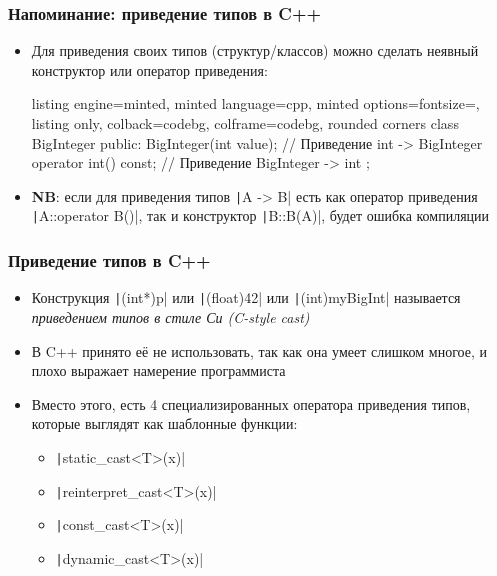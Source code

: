 \documentclass[10pt]{beamer}
\begin{document}
\begin{frame}[fragile]
\frametitle{Напоминание: приведение типов в C++}
\begin{itemize}
\item Для приведения своих типов (структур/классов) можно сделать неявный конструктор или оператор приведения:
\begin{tcblisting}{listing engine=minted, minted language=cpp, minted options={fontsize=\scriptsize}, listing only, colback=codebg, colframe=codebg, rounded corners}
class BigInteger {
public:
  BigInteger(int value); // Приведение int -> BigInteger
  operator int() const; // Приведение BigInteger -> int
};
\end{tcblisting}
\pause
{}
\item \textbf{NB}: если для приведения типов \texttt|A -> B| есть как оператор приведения \texttt|A::operator B()|, так и конструктор \texttt|B::B(A)|, будет ошибка компиляции
\end{itemize}
\end{frame}

\begin{frame}[fragile]
\frametitle{Приведение типов в C++}
\begin{itemize}
\item Конструкция \texttt|(int*)p| или \texttt|(float)42| или \texttt|(int)myBigInt| называется \textit{приведением типов в стиле Си (C-style cast)}
\pause
\item В C++ принято её не использовать, так как она умеет слишком многое, и плохо выражает намерение программиста
\pause
\item Вместо этого, есть 4 специализированных оператора приведения типов, которые выглядят как шаблонные функции:
\pause
\begin{itemize}
\item \texttt|static_cast<T>(x)|
\pause
\item \texttt|reinterpret_cast<T>(x)|
\pause
\item \texttt|const_cast<T>(x)|
\pause
\item \texttt|dynamic_cast<T>(x)|
\end{itemize}
\end{itemize}
\end{frame}
\end{document}
